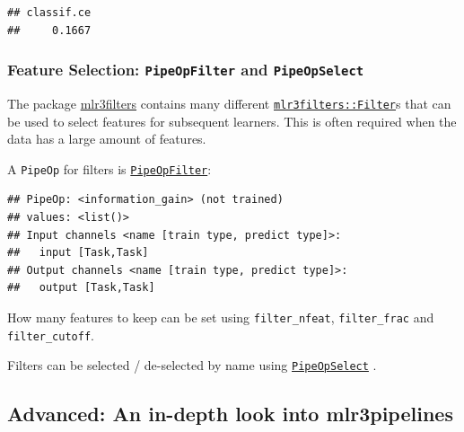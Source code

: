 \documentclass[]{article}
\newenvironment{Shaded}{\begin{snugshade}}{\end{snugshade}}
\newcommand{\KeywordTok}[1]{\textcolor[rgb]{0.13,0.29,0.53}{\textbf{#1}}}
\newcommand{\NormalTok}[1]{#1}
\newcommand{\OperatorTok}[1]{\textcolor[rgb]{0.81,0.36,0.00}{\textbf{#1}}}
\renewenvironment{Shaded} {\begin{snugshade}\small} {\end{snugshade}}
\begin{document}
\begin{verbatim}
## classif.ce 
##     0.1667
\end{verbatim}

\hypertarget{feature-selection-pipeopfilter-and-pipeopselect}{%
\subsubsection{\texorpdfstring{Feature Selection: \texttt{PipeOpFilter} and \texttt{PipeOpSelect}}{Feature Selection: PipeOpFilter and PipeOpSelect}}\label{feature-selection-pipeopfilter-and-pipeopselect}}

The package \href{https://mlr3filters.mlr-org.com}{mlr3filters} contains many different \href{https://mlr3filters.mlr-org.com/reference/Filter.html}{\texttt{mlr3filters::Filter}}s that can be used to select features for subsequent learners.
This is often required when the data has a large amount of features.

A \texttt{PipeOp} for filters is \href{https://mlr3pipelines.mlr-org.com/reference/mlr_pipeops_filter.html}{\texttt{PipeOpFilter}}:

\begin{Shaded}
\end{Shaded}

\begin{verbatim}
## PipeOp: <information_gain> (not trained)
## values: <list()>
## Input channels <name [train type, predict type]>:
##   input [Task,Task]
## Output channels <name [train type, predict type]>:
##   output [Task,Task]
\end{verbatim}

How many features to keep can be set using \texttt{filter\_nfeat}, \texttt{filter\_frac} and \texttt{filter\_cutoff}.

Filters can be selected / de-selected by name using \href{https://mlr3pipelines.mlr-org.com/reference/mlr_pipeops_select.html}{\texttt{PipeOpSelect}} .

\hypertarget{advanced-an-in-depth-look-into-mlr3pipelines}{%
\subsection{Advanced: An in-depth look into mlr3pipelines}\label{advanced-an-in-depth-look-into-mlr3pipelines}}
\end{document}
